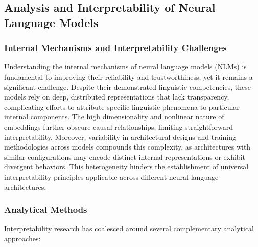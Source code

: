 \documentclass[sigconf]{acmart}
\begin{document}
\subsection{Analysis and Interpretability of Neural Language Models}

\subsubsection{Internal Mechanisms and Interpretability Challenges}

Understanding the internal mechanisms of neural language models (NLMs) is fundamental to improving their reliability and trustworthiness, yet it remains a significant challenge. Despite their demonstrated linguistic competencies, these models rely on deep, distributed representations that lack transparency, complicating efforts to attribute specific linguistic phenomena to particular internal components. The high dimensionality and nonlinear nature of embeddings further obscure causal relationships, limiting straightforward interpretability. Moreover, variability in architectural designs and training methodologies across models compounds this complexity, as architectures with similar configurations may encode distinct internal representations or exhibit divergent behaviors. This heterogeneity hinders the establishment of universal interpretability principles applicable across different neural language architectures.

\subsubsection{Analytical Methods}

Interpretability research has coalesced around several complementary analytical approaches:
\end{document}
